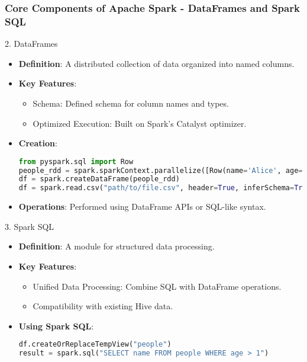 \documentclass[aspectratio=169]{beamer}
\begin{document}
\begin{frame}[fragile]
    \frametitle{Core Components of Apache Spark - DataFrames and Spark SQL}
    \begin{block}{2. DataFrames}
        \begin{itemize}
            \item \textbf{Definition}: A distributed collection of data organized into named columns.
            \item \textbf{Key Features}:
                \begin{itemize}
                    \item Schema: Defined schema for column names and types.
                    \item Optimized Execution: Built on Spark’s Catalyst optimizer.
                \end{itemize}
            \item \textbf{Creation}:
                \begin{lstlisting}[language=Python]
from pyspark.sql import Row
people_rdd = spark.sparkContext.parallelize([Row(name='Alice', age=1), Row(name='Bob', age=2)])
df = spark.createDataFrame(people_rdd)
df = spark.read.csv("path/to/file.csv", header=True, inferSchema=True)
                \end{lstlisting}
            \item \textbf{Operations}: Performed using DataFrame APIs or SQL-like syntax.
        \end{itemize}
    \end{block}
    
    \begin{block}{3. Spark SQL}
        \begin{itemize}
            \item \textbf{Definition}: A module for structured data processing.
            \item \textbf{Key Features}:
                \begin{itemize}
                    \item Unified Data Processing: Combine SQL with DataFrame operations.
                    \item Compatibility with existing Hive data.
                \end{itemize}
            \item \textbf{Using Spark SQL}:
                \begin{lstlisting}[language=Python]
df.createOrReplaceTempView("people")
result = spark.sql("SELECT name FROM people WHERE age > 1")
                \end{lstlisting}
        \end{itemize}
    \end{block}
\end{frame}
\end{document}
